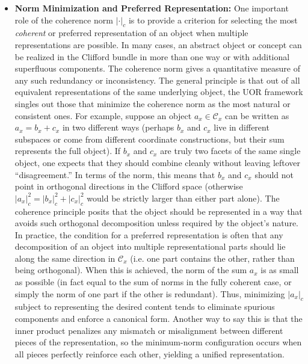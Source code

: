 \documentclass[12pt]{article}
\begin{document}
\begin{itemize}
    \item \textbf{Norm Minimization and Preferred Representation:} One important role of the coherence norm $|\cdot|_c$ is to provide a criterion for selecting the most \emph{coherent} or preferred representation of an object when multiple representations are possible. In many cases, an abstract object or concept can be realized in the Clifford bundle in more than one way or with additional superfluous components. The coherence norm gives a quantitative measure of any such redundancy or inconsistency. The general principle is that out of all equivalent representations of the same underlying object, the UOR framework singles out those that minimize the coherence norm as the most natural or consistent ones. For example, suppose an object $a_x \in \mathcal{C}_x$ can be written as $a_x = b_x + c_x$ in two different ways (perhaps $b_x$ and $c_x$ live in different subspaces or come from different coordinate constructions, but their sum represents the full object). If $b_x$ and $c_x$ are truly two facets of the same single object, one expects that they should combine cleanly without leaving leftover “disagreement.” In terms of the norm, this means that $b_x$ and $c_x$ should not point in orthogonal directions in the Clifford space (otherwise $|a_x|_c^2 = |b_x|_c^2 + |c_x|_c^2$ would be strictly larger than either part alone). The coherence principle posits that the object should be represented in a way that avoids such orthogonal decomposition unless required by the object’s nature. In practice, the condition for a preferred representation is often that any decomposition of an object into multiple representational parts should lie along the same direction in $\mathcal{C}_x$ (i.e. one part contains the other, rather than being orthogonal). When this is achieved, the norm of the sum $a_x$ is as small as possible (in fact equal to the sum of norms in the fully coherent case, or simply the norm of one part if the other is redundant). Thus, minimizing $|a_x|_c$ subject to representing the desired content tends to eliminate spurious components and enforce a canonical form. Another way to say this is that the inner product penalizes any mismatch or misalignment between different pieces of the representation, so the minimum-norm configuration occurs when all pieces perfectly reinforce each other, yielding a unified representation.


\end{itemize}
\end{document}
